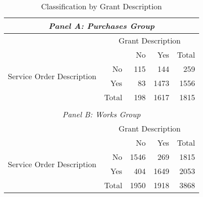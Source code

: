 \begin{table}[!htbp]
  \caption{\label{tab:textualdescription}Classification by Grant Description}
  \centering
  \scriptsize
  \begin{tabular}{crrrr}
    \hline

    \hline
    \multicolumn{5}{c}{\emph{Panel A: Purchases Group}} \T \B \\
    \hline
    & \multicolumn{4}{c}{\parbox{.25\textwidth}{\centering Grant Description}} \T \B \\
    \multicolumn{1}{c}{\multirow{4}{*}{\parbox[c][][c]{.15\textwidth}{\centering Service Order Description}}} & \multicolumn{1}{l}{} & No & Yes & Total \T \B \\
                         \cline{2-5}
    \multicolumn{1}{c}{} & No        & 115       & 144       & 259  \T \B \\
    \multicolumn{1}{c}{} & Yes       & 83        & 1473      & 1556 \T \B \\
                         \cline{2-5}
    \multicolumn{1}{c}{} & Total     & 198       & 1617      & 1815 \T \B \\
    & & & & \\
    \hline
    \multicolumn{5}{c}{\emph{Panel B: Works Group}} \T \B \\
    \hline
    & \multicolumn{4}{c}{\parbox{.25\textwidth}{\centering Grant Description}} \T \B \\
    \multirow{4}{*}{\parbox[c][][c]{.15\textwidth}{\centering Service Order Description}}                     & \multicolumn{1}{l}{} & No & Yes & Total \T \B \\
                         \cline{2-5}
                         & No        & 1546      & 269       & 1815 \T \B \\
                         & Yes       & 404       & 1649      & 2053 \T \B \\
                         \cline{2-5}
                         & Total     & 1950      & 1918      & 3868 \T \B \\
    \hline

    \hline
  \end{tabular}
\end{table}